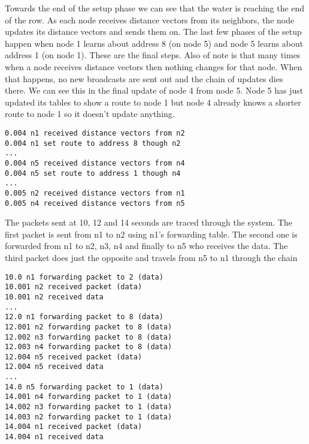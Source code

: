 \documentclass[11pt]{article}
\begin{document}
Towards the end of the setup phase we can see that the water is reaching the end of the row. As each node receives distance vectors from its neighbors, the node updates its distance vectors and sends them on. The last few phases of the setup happen when node 1 learns about address 8 (on node 5) and node 5 learns about address 1 (on node 1). These are the final steps. Also of note is that many times when a node receives distance vectors then nothing changes for that node. When that happens, no new broadcasts are sent out and the chain of updates dies there. We can see this in the final update of node 4 from node 5. Node 5 has just updated its tables to show a route to node 1 but node 4 already knows a shorter route to node 1 so it doesn't update anything.

\vspace{5mm}

\begin{lstlisting}
0.004 n1 received distance vectors from n2
0.004 n1 set route to address 8 though n2
...
0.004 n5 received distance vectors from n4
0.004 n5 set route to address 1 though n4
...
0.005 n2 received distance vectors from n1
0.005 n4 received distance vectors from n5
\end{lstlisting}

\vspace{5mm}

The packets sent at 10, 12 and 14 seconds are traced through the system. The first packet is sent from n1 to n2 using n1's forwarding table. The second one is forwarded from n1 to n2, n3, n4 and finally to n5 who receives the data. The third packet does just the opposite and travels from n5 to n1 through the chain

\vspace{5mm}

\begin{lstlisting}
10.0 n1 forwarding packet to 2 (data)
10.001 n2 received packet (data)
10.001 n2 received data
...
12.0 n1 forwarding packet to 8 (data)
12.001 n2 forwarding packet to 8 (data)
12.002 n3 forwarding packet to 8 (data)
12.003 n4 forwarding packet to 8 (data)
12.004 n5 received packet (data)
12.004 n5 received data
...
14.0 n5 forwarding packet to 1 (data)
14.001 n4 forwarding packet to 1 (data)
14.002 n3 forwarding packet to 1 (data)
14.003 n2 forwarding packet to 1 (data)
14.004 n1 received packet (data)
14.004 n1 received data
\end{lstlisting}

\vspace{5mm}
\end{document}
